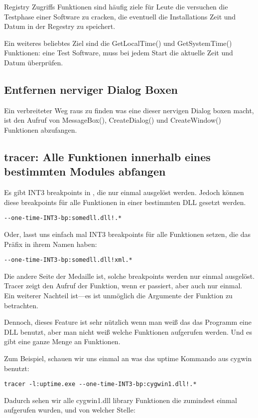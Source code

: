 Registry Zugriffs Funktionen sind h\"aufig ziele f\"ur Leute die versuchen die Testphase einer Software zu cracken, die 
eventuell die Installations Zeit und Datum in der Regestry zu speichert. 

Ein weiteres beliebtes Ziel sind die GetLocalTime() und GetSystemTime() Funktionen:
eine Test Software, muss bei jedem Start die aktuelle Zeit und Datum \"uberpr\"ufen.

\subsection{Entfernen nerviger Dialog Boxen}

Ein verbreiteter Weg raus zu finden was eine dieser nervigen Dialog boxen macht, ist den 
Aufruf von MessageBox(), CreateDialog() und CreateWindow() Funktionen abzufangen.


\subsection{tracer: Alle Funktionen innerhalb eines bestimmten Modules abfangen}


Es gibt INT3 breakpoints in \tracer, die nur einmal ausgel\"ost werden. Jedoch k\"onnen diese breakpoints f\"ur alle 
Funktionen in einer bestimmten DLL gesetzt werden.

\begin{lstlisting}
--one-time-INT3-bp:somedll.dll!.*
\end{lstlisting}

Oder, lasst uns einfach mal INT3 breakpoints f\"ur alle Funktionen setzen, die das  Pr\"afix in ihrem Namen haben:

\begin{lstlisting}
--one-time-INT3-bp:somedll.dll!xml.*
\end{lstlisting}

Die andere Seite der Medaille ist, solche breakpoints werden nur einmal ausgel\"ost.
Tracer zeigt den Aufruf der Funktion, wenn er passiert, aber auch nur einmal. 
Ein weiterer Nachteil ist---es ist unm\"oglich die Argumente der Funktion zu betrachten.

Dennoch, dieses Feature ist sehr n\"utzlich wenn man weiß das das Programm eine DLL benutzt,
aber man nicht weiß welche Funktionen aufgerufen werden. Und es gibt eine ganze Menge an 
Funktionen.


\par
{}
Zum Beispiel, schauen wir uns einmal an was das uptime Kommando aus cygwin benutzt:

\begin{lstlisting}
tracer -l:uptime.exe --one-time-INT3-bp:cygwin1.dll!.*
\end{lstlisting}

Dadurch sehen wir alle cygwin1.dll library Funktionen die zumindest einmal aufgerufen wurden, und von welcher
Stelle: 


